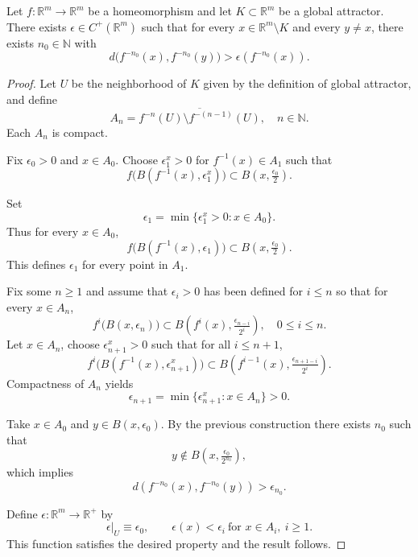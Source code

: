 \documentclass[10pt,a4paper]{amsart}
\newcommand{\N}{{\mathbb{N}}}
\newcommand{\R}{{\mathbb{R}}}
\begin{document}
	\begin{lemma}\label{epsilon_expansivo_gral}
		Let $f:\R^m\to \R^m$ be a homeomorphism and let $K\subset \R^m$ be a global attractor.  
		There exists $\epsilon\in C^+(\R^m)$ such that for every $x\in \R^m\setminus K$ and every $y\neq x$, there exists $n_0\in \N$ with  
		\[
		d\big(f^{-n_0}(x), f^{-n_0}(y)\big)>\epsilon(f^{-n_0}(x)).
		\]
	\end{lemma}

	\begin{proof}
		Let $U$ be the neighborhood of $K$ given by the definition of global attractor, and define  
		\[
		A_n=\overline{f^{-n}(U)\setminus f^{-(n-1)}(U)},\quad n\in\N.
		\]
		Each $A_n$ is compact.
		
		
		  
		Fix $\epsilon_0>0$ and   $x\in A_0$.  
		Choose $\epsilon_1^x>0$ for $f^{-1}(x)\in A_1$ such that  
		\[
		f\big(B(f^{-1}(x), \epsilon_1^x)\big)\subset B(x,\tfrac{\epsilon_0}{2}).
		\] 
		
		Set  
		\[
		\epsilon_1=\min\{\epsilon_1^{x}>0: x\in A_0\}.
		\]  
		Thus for every $x\in A_0$,  
		\[
		f\big(B(f^{-1}(x), \epsilon_1)\big)\subset B(x,\tfrac{\epsilon_0}{2}).
		\]  
		This defines $\epsilon_1$ for every point in $A_1$.		
		
		
		
		
		
		
		
		
		
		
		
	 
		Fix some $n\geq 1$ and assume that $\epsilon_i>0$ has been defined for $i\leq n$ so that for every $x\in A_n$,  
		\[
		f^i\big(B(x,\epsilon_n)\big)\subset B\!\left(f^i(x), \tfrac{\epsilon_{n-i}}{2^i}\right),\quad 0\leq i\leq n.
		\]  
		Let $x\in A_n$,  
		choose $\epsilon_{n+1}^x>0$ such that for all $i\leq n+1$,  
		\[
		f^i\big(B(f^{-1}(x),\epsilon_{n+1}^x)\big)\subset B\!\left(f^{i-1}(x), \tfrac{\epsilon_{n+1-i}}{2^i}\right).
		\]  
		Compactness of $A_n$ yields   
		\[
		\epsilon_{n+1}=\min\{\epsilon_{n+1}^{x}: x\in A_n\}>0.
		\]  
		
		
		
	
		Take $x\in A_0$ and $y\in B(x,\epsilon_0)$.  
		By the previous construction there exists $n_0$ such that  
		\[
		y\notin B\!\left(x,\tfrac{\epsilon_0}{2^{n_0}}\right),
		\]
		which implies  
		\[
		d(f^{-n_0}(x), f^{-n_0}(y))>\epsilon_{n_0}.
		\]
		
		
		
	
		Define $\epsilon:\R^m\to \R^+$ by  
		\[
		\epsilon|_U \equiv \epsilon_0, 
		\qquad \epsilon(x)<\epsilon_i \ \text{for } x\in A_i,\ i\geq 1.
		\]
		This function satisfies the desired property and the result follows.
	\end{proof}
\end{document}
